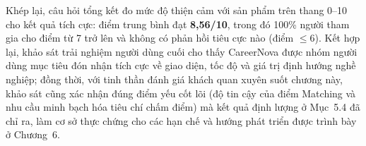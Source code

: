 Khép lại, câu hỏi tổng kết đo mức độ thiện cảm với sản phẩm trên thang 0--10 cho kết quả tích cực: điểm trung bình đạt \textbf{8,56/10}, trong đó 100\% người tham gia cho điểm từ 7 trở lên và không có phản hồi tiêu cực nào (điểm $\le 6$). Kết hợp lại, khảo sát trải nghiệm người dùng cuối cho thấy CareerNova được nhóm người dùng mục tiêu đón nhận tích cực về giao diện, tốc độ và giá trị định hướng nghề nghiệp; đồng thời, với tinh thần đánh giá khách quan xuyên suốt chương này, khảo sát cũng xác nhận đúng điểm yếu cốt lõi (độ tin cậy của điểm Matching và nhu cầu minh bạch hóa tiêu chí chấm điểm) mà kết quả định lượng ở Mục~5.4 đã chỉ ra, làm cơ sở thực chứng cho các hạn chế và hướng phát triển được trình bày ở Chương~6.
